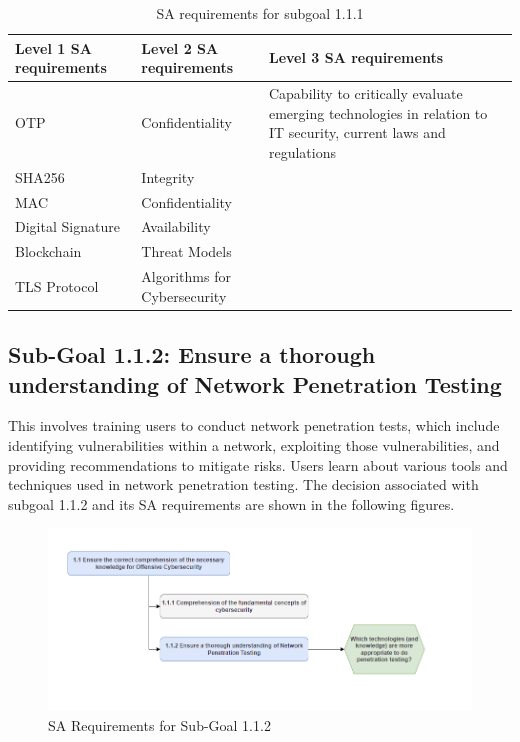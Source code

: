 \begin{table}[H]
    \begin{center}
    \begin{tabular}{ | m{5cm} | m{5cm}| m{5cm} | } 
      \hline
      \textbf{Level 1 SA requirements} & \textbf{Level 2 SA requirements}  & \textbf{Level 3 SA requirements}  \\ 
      \hline
      OTP & Confidentiality & Capability to critically evaluate emerging technologies in relation to IT security, current laws and regulations\\ 
      \hline
      SHA256 & Integrity & \\ 
      \hline
      MAC & Confidentiality & \\ 
      \hline
      Digital Signature & Availability  & \\ 
      \hline
      Blockchain & Threat Models  & \\ 
      \hline
      TLS Protocol & Algorithms for Cybersecurity & \\ 
      \hline
    \end{tabular}
    \end{center}
    \caption{SA requirements for subgoal 1.1.1}
    \end{table}
    
\newpage
\subsection{Sub-Goal 1.1.2: Ensure a thorough understanding of Network Penetration Testing}
This involves training users to conduct network penetration tests, which include identifying vulnerabilities within a network, exploiting those vulnerabilities, and providing recommendations to mitigate risks. Users learn about various tools and techniques used in network penetration testing.
The decision associated with subgoal 1.1.2 and its SA requirements are shown in the following figures.
\begin{figure}[H]
    \centering
    \includegraphics[width=\textwidth]{./assets/subgoal_1.1.2.png}
    \caption{SA Requirements for Sub-Goal 1.1.2}
    \label{fig:subgoal_1.1.2}
\end{figure}

